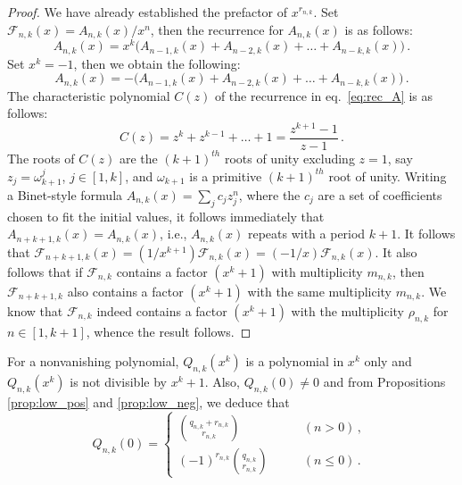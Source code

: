 \documentclass[review]{elsarticle}
\theoremstyle{plain}
\begin{document}
\begin{proof}
We have already established the prefactor of $x^{r_{n,k}}$.
Set $\mathcal{F}_{n,k}(x) = A_{n,k}(x)/x^n$, then the recurrence for $A_{n,k}(x)$ is as follows:
\begin{equation}  
A_{n,k}(x) = x^k\bigl(A_{n-1,k}(x) +A_{n-2,k}(x) +\dots +A_{n-k,k}(x)\bigr) \,.
\end{equation}
Set $x^k=-1$, then we obtain the following:
\begin{equation}  
\label{eq:rec_A}
A_{n,k}(x) = -\bigl(A_{n-1,k}(x) +A_{n-2,k}(x) +\dots +A_{n-k,k}(x)\bigr) \,.
\end{equation}
The characteristic polynomial $C(z)$ of the recurrence in eq.~\eqref{eq:rec_A} is as follows:
\begin{equation}  
C(z) = z^k +z^{k-1} +\dots +1 = \frac{z^{k+1}-1}{z-1} \,.
\end{equation}
The roots of $C(z)$ are the $(k+1)^{th}$ roots of unity excluding $z=1$,
say $z_j = \omega_{k+1}^j$, $j\in[1,k]$, and $\omega_{k+1}$ is a primitive $(k+1)^{th}$ root of unity.
Writing a Binet-style formula $A_{n,k}(x) = \sum_j c_jz_j^n$, where the $c_j$ are a set of coefficients chosen to fit the initial values,
it follows immediately that $A_{n+k+1,k}(x) = A_{n,k}(x)$, i.e., $A_{n,k}(x)$ repeats with a period $k+1$.
It follows that $\mathcal{F}_{n+k+1,k}(x) = (1/x^{k+1})\mathcal{F}_{n,k}(x) = (-1/x)\mathcal{F}_{n,k}(x)$.
It also follows that if $\mathcal{F}_{n,k}$ contains a factor $(x^k+1)$ with multiplicity $m_{n,k}$, then
$\mathcal{F}_{n+k+1,k}$ also contains a factor $(x^k+1)$ with the same multiplicity $m_{n,k}$.
We know that $\mathcal{F}_{n,k}$ indeed contains a factor $(x^k+1)$ with the multiplicity $\rho_{n,k}$ for $n\in[1,k+1]$,
whence the result follows.
\end{proof}
For a nonvanishing polynomial,
$Q_{n,k}(x^k)$ is a polynomial in $x^k$ only and $Q_{n,k}(x^k)$ is not divisible by $x^k+1$.
Also, $Q_{n,k}(0)\ne0$ and
from Propositions \ref{prop:low_pos} and \ref{prop:low_neg}, we deduce that
\begin{equation}  
  Q_{n,k}(0) = \begin{cases} \displaystyle \binom{q_{n,k}+r_{n,k}}{r_{n,k}} &\qquad (n>0)\,,\phantom{\Biggl|}
    \\ \displaystyle (-1)^{r_{n,k}}\binom{q_{n,k}}{r_{n,k}} &\qquad (n\le0)\,. \end{cases}
\end{equation}
\end{document}
